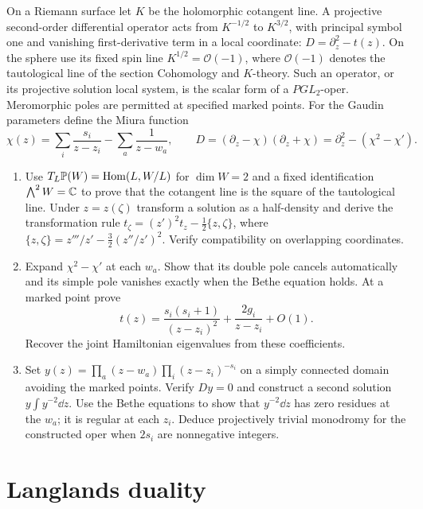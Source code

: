 \begin{exercise}
On a Riemann surface let $K$ be the holomorphic cotangent line.
A projective second-order differential operator acts from
$K^{-1/2}$ to $K^{3/2}$, with principal symbol one and
vanishing first-derivative term in a local coordinate:
$D=\partial_z^2-t(z)$. On the sphere use its fixed spin line
$K^{1/2}=\mathcal O(-1)$, where $\mathcal O(-1)$ denotes the
tautological line of the section Cohomology and $K$-theory.
Such an operator, or its projective
solution local system, is the scalar form of a $PGL_2$-oper.
Meromorphic poles are permitted at specified marked points.
For the Gaudin parameters define the Miura function
\[
 \chi(z)=\sum_i\frac{s_i}{z-z_i}-\sum_a\frac1{z-w_a},
 \qquad
 D=(\partial_z-\chi)(\partial_z+\chi)
   =\partial_z^2-(\chi^2-\chi').
\]
\begin{enumerate}[label=(\alph*)]
\item Use $T_L\mathbb P(W)=\operatorname{Hom}(L,W/L)$ for $\dim W=2$
and a fixed identification $\bigwedge^2W=\mathbb C$ to prove that
the cotangent line is the square of the tautological line.
Under $z=z(\zeta)$ transform a solution as a
half-density and derive the transformation rule
$t_\zeta=(z')^2t_z-\frac12\{z,\zeta\}$, where
$\{z,\zeta\}=z'''/z'-\frac32(z''/z')^2$.
Verify compatibility on overlapping coordinates.
\item Expand $\chi^2-\chi'$ at each $w_a$. Show that its
double pole cancels automatically and its simple pole
vanishes exactly when the Bethe equation holds. At a marked
point prove
\[
 t(z)=\frac{s_i(s_i+1)}{(z-z_i)^2}
                  +\frac{2g_i}{z-z_i}+O(1).
\]
Recover the joint Hamiltonian eigenvalues from these coefficients.
\item Set
$y(z)=\prod_a(z-w_a)\prod_i(z-z_i)^{-s_i}$ on a simply
connected domain avoiding the marked points. Verify $Dy=0$
and construct a second solution $y\int y^{-2}\dd z$.
Use the Bethe equations to show that $y^{-2}\dd z$ has
zero residues at the $w_a$; it is regular at each $z_i$.
Deduce projectively trivial monodromy for the constructed
oper when $2s_i$ are nonnegative integers.
\end{enumerate}
\end{exercise}

\section{Langlands duality}


